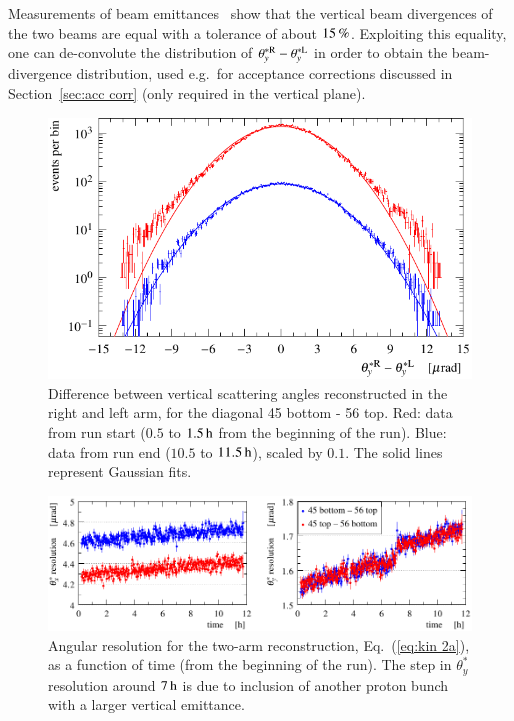 Measurements of beam emittances~\cite{op-elog} show that the vertical beam divergences of the two beams are equal with a tolerance of about $15\,{\rm \%}$. Exploiting this equality, one can de-convolute the distribution of $\theta_y^{*\rm R} - \theta_y^{*\rm L}$ in order to obtain the beam-divergence distribution, used e.g.~for acceptance corrections discussed in Section~\ref{sec:acc corr} (only required in the vertical plane).

\begin{figure}
\begin{center}
\includegraphics{fig/beam_divergence_fits.pdf}
\vskip-4mm
\caption{%
Difference between vertical scattering angles reconstructed in the right and left arm, for the diagonal 45 bottom - 56 top. Red: data from run start ($0.5$ to $1.5\,{\rm h}$ from the beginning of the run). Blue: data from run end ($10.5$ to $11.5\,{\rm h}$), scaled by $0.1$. The solid lines represent Gaussian fits.
}
\label{fig:beam divergence}
\end{center}
\end{figure}



\begin{figure}
\begin{center}
\includegraphics{fig/resolutions_vs_time.pdf}
\vskip-4mm
\caption{%
Angular resolution for the two-arm reconstruction, Eq.~(\ref{eq:kin 2a}), as a function of time (from the beginning of the run). The step in $\theta_y^*$ resolution around $7\,{\rm h}$ is due to inclusion of another proton bunch with a larger vertical emittance.
}
\label{fig:resolutions}
\end{center}
\end{figure}




